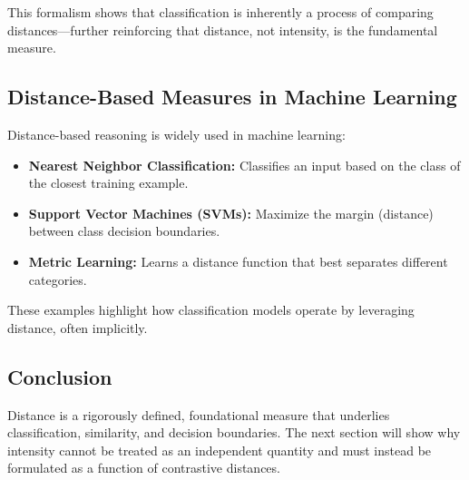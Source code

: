 This formalism shows that classification is inherently a process of comparing distances—further reinforcing that distance, not intensity, is the fundamental measure.

\subsection{Distance-Based Measures in Machine Learning}

Distance-based reasoning is widely used in machine learning:

\begin{itemize}
    \item \textbf{Nearest Neighbor Classification:} Classifies an input based on the class of the closest training example.
    \item \textbf{Support Vector Machines (SVMs):} Maximize the margin (distance) between class decision boundaries.
    \item \textbf{Metric Learning:} Learns a distance function that best separates different categories.
\end{itemize}

These examples highlight how classification models operate by leveraging distance, often implicitly.

\subsection{Conclusion}

Distance is a rigorously defined, foundational measure that underlies classification, similarity, and decision boundaries. The next section will show why intensity cannot be treated as an independent quantity and must instead be formulated as a function of contrastive distances.
